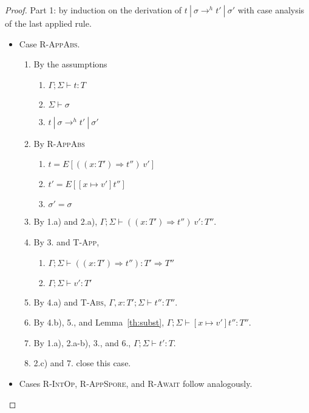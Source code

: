 \begin{proof}

Part 1: by induction on the derivation of $t~|~\sigma \rightarrow^h t'~|~\sigma'$ with case analysis of the last applied rule.

\begin{itemize}
\item Case \textsc{R-AppAbs}.
\begin{enumerate}
\item By the assumptions
  \begin{enumerate}[label=(\alph*)]
  \item $\Gamma ; \Sigma \vdash t : T$
  \item $\Sigma \vdash \sigma$
  \item $t~|~\sigma \rightarrow^h t'~|~\sigma'$
  \end{enumerate}
\item By \textsc{R-AppAbs}
  \begin{enumerate}[label=(\alph*)]
  \item $t = E[((x : T') \Rightarrow t'')~v']$
  \item $t' = E[[x \mapsto v']t'']$
  \item $\sigma' = \sigma$
  \end{enumerate}
\item By 1.a) and 2.a), $\Gamma ; \Sigma \vdash ((x : T') \Rightarrow t'')~v' : T''$.
\item By 3. and \textsc{T-App},
  \begin{enumerate}[label=(\alph*)]
  \item $\Gamma ; \Sigma \vdash ((x : T') \Rightarrow t'') : T' \Rightarrow T''$
  \item $\Gamma ; \Sigma \vdash v' : T'$
  \end{enumerate}
\item By 4.a) and \textsc{T-Abs}, $\Gamma , x : T' ; \Sigma \vdash t'' : T''$.
\item By 4.b), 5., and Lemma~\ref{th:subst}, $\Gamma ; \Sigma \vdash [x \mapsto v']t'' : T''$.
\item By 1.a), 2.a-b), 3., and 6., $\Gamma ; \Sigma \vdash t' : T$.
\item 2.c) and 7. close this case.
\end{enumerate}

\item Cases \textsc{R-IntOp}, \textsc{R-AppSpore}, and \textsc{R-Await} follow analogously.


\end{itemize}
\end{proof}
